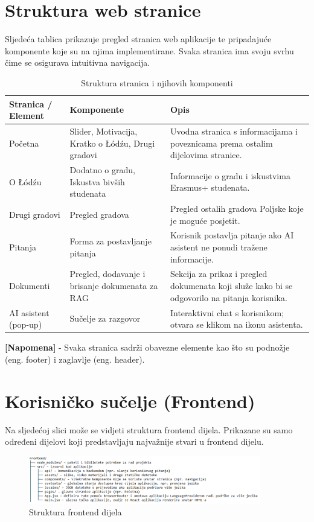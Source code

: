 \documentclass[]{foi}
\renewcommand{\arraystretch}{1.3}
\begin{document}
\section{Struktura web stranice}
Sljedeća tablica prikazuje pregled stranica web aplikacije te pripadajuće komponente koje su na njima implementirane. Svaka stranica ima svoju
svrhu čime se osigurava intuitivna navigacija. 
\begin{table}[ht!]
\centering
\caption{Struktura stranica i njihovih komponenti}
\renewcommand{\arraystretch}{1.4}
\begin{tabular}{|p{3.5cm}|p{5cm}|p{6.2cm}|}
\hline
\textbf{Stranica / Element} & \textbf{Komponente} & \textbf{Opis} \\
\hline
Početna & Slider, Motivacija, Kratko o Łódźu, Drugi gradovi & Uvodna stranica s informacijama i poveznicama prema ostalim dijelovima stranice. \\
\hline
O Łódźu & Dodatno o gradu, Iskustva bivših studenata & Informacije o gradu i iskustvima Erasmus+ studenata. \\
\hline
Drugi gradovi & Pregled gradova & Pregled ostalih gradova Poljske koje je moguće posjetit. \\
\hline
Pitanja & Forma za postavljanje pitanja & Korisnik postavlja pitanje ako AI asistent ne ponudi tražene informacije. \\
\hline
Dokumenti & Pregled, dodavanje i brisanje dokumenata za RAG & Sekcija za prikaz i pregled dokumenata koji služe kako bi se odgovorilo na pitanja korisnika. \\
\hline
AI asistent (pop-up) & Sučelje za razgovor & Interaktivni chat s korisnikom; otvara se klikom na ikonu asistenta. \\
\hline
\end{tabular}
\end{table}

\textbf{[Napomena]} - Svaka stranica sadrži obavezne elemente kao što su podnožje (eng. footer) i zaglavlje (eng. header).

\section{Korisničko sučelje (Frontend)}
Na sljedećoj slici može se vidjeti struktura frontend dijela. Prikazane su samo određeni dijelovi koji predstavljaju najvažnije
stvari u frontend dijelu.
\begin{figure}[ht!]
    \centering
    \includegraphics[width=0.9\textwidth]{./assets/frontendstructure.png} 
    \caption{Struktura frontend dijela}
    \label{fig:slika18}
\end{figure}
\end{document}
